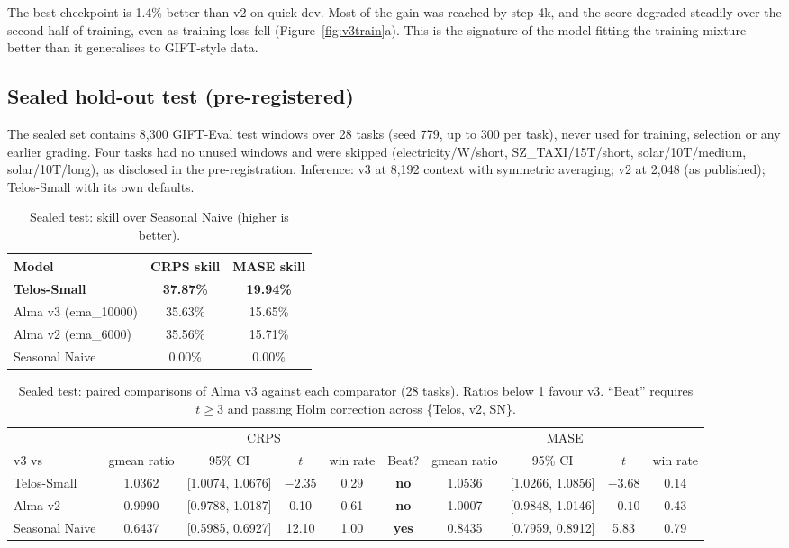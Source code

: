 \documentclass[10pt,a4paper]{extarticle}
\newcommand{\yes}{\textcolor{good}{\textbf{yes}}}
\newcommand{\no}{\textcolor{bad}{\textbf{no}}}
\begin{document}
The best checkpoint is 1.4\% better than v2 on quick-dev. Most of the gain was reached by step 4k, and the score degraded
steadily over the second half of training, even as training loss fell (Figure~\ref{fig:v3train}a). This is the signature of the
model fitting the training mixture better than it generalises to GIFT-style data.

\subsection{Sealed hold-out test (pre-registered)}
The sealed set contains 8{,}300 GIFT-Eval test windows over 28 tasks (seed 779, up to 300 per task), never used for training,
selection or any earlier grading. Four tasks had no unused windows and were skipped (electricity/W/short, SZ\_TAXI/15T/short,
solar/10T/medium, solar/10T/long), as disclosed in the pre-registration. Inference: v3 at 8{,}192 context with symmetric
averaging; v2 at 2{,}048 (as published); Telos-Small with its own defaults.

\begin{table}[H]
\centering\small
\caption{Sealed test: skill over Seasonal Naive (higher is better).}
\label{tab:sealed_skill}
\begin{tabular}{@{}lcc@{}}
\toprule
Model & CRPS skill & MASE skill \\
\midrule
\textbf{Telos-Small} & \textbf{37.87\%} & \textbf{19.94\%} \\
Alma v3 (ema\_10000) & 35.63\% & 15.65\% \\
Alma v2 (ema\_6000) & 35.56\% & 15.71\% \\
Seasonal Naive & 0.00\% & 0.00\% \\
\bottomrule
\end{tabular}
\end{table}

\begin{table}[H]
\centering\small
\caption{Sealed test: paired comparisons of Alma v3 against each comparator (28 tasks). Ratios below 1 favour v3.
``Beat'' requires $t\ge3$ and passing Holm correction across \{Telos, v2, SN\}.}
\label{tab:sealed_tests}
\setlength{\tabcolsep}{4pt}
\begin{tabular}{@{}l cccc c cccc@{}}
\toprule
 & \multicolumn{5}{c}{CRPS} & \multicolumn{4}{c}{MASE} \\
\cmidrule(lr){2-6}\cmidrule(l){7-10}
v3 vs & gmean ratio & 95\% CI & $t$ & win rate & Beat? & gmean ratio & 95\% CI & $t$ & win rate \\
\midrule
Telos-Small & 1.0362 & [1.0074, 1.0676] & $-2.35$ & 0.29 & \no & 1.0536 & [1.0266, 1.0856] & $-3.68$ & 0.14 \\
Alma v2 & 0.9990 & [0.9788, 1.0187] & 0.10 & 0.61 & \no & 1.0007 & [0.9848, 1.0146] & $-0.10$ & 0.43 \\
Seasonal Naive & 0.6437 & [0.5985, 0.6927] & 12.10 & 1.00 & \yes & 0.8435 & [0.7959, 0.8912] & 5.83 & 0.79 \\
\bottomrule
\end{tabular}
\end{table}
\end{document}

